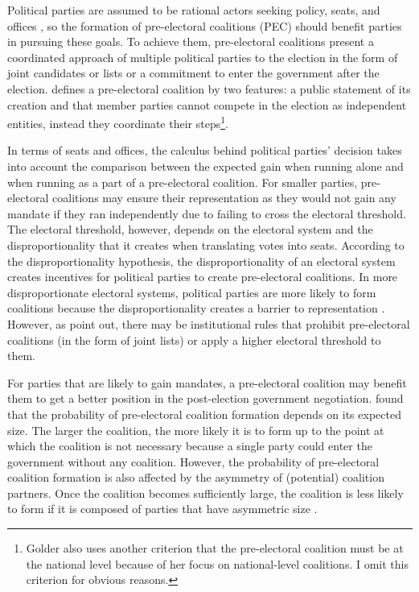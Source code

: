 \documentclass[fignum,12pt,titlepage]{article}
\begin{document}
Political parties are assumed to be rational actors seeking policy, seats, and offices \parencite{muller1999}, so the formation of pre-electoral coalitions (PEC) should benefit parties in pursuing these goals. To achieve them, pre-electoral coalitions present a coordinated approach of multiple political parties to the election in the form of joint candidates or lists or a commitment to enter the government after the election. \textcite[12]{golder2006} defines a pre-electoral coalition by two features: a public statement of its creation and that member parties cannot compete in the election as independent entities, instead they coordinate their steps\footnote{Golder also uses another criterion that the pre-electoral coalition must be at the national level because of her focus on national-level coalitions. I omit this criterion for obvious reasons.}.

In terms of seats and offices, the calculus behind political parties' decision takes into account the comparison between the expected gain when running alone and when running as a part of a pre-electoral coalition. For smaller parties, pre-electoral coalitions may ensure their representation as they would not gain any mandate if they ran independently due to failing to cross the electoral threshold. The electoral threshold, however, depends on the electoral system and the disproportionality that it creates when translating votes into seats. According to the disproportionality hypothesis, the disproportionality of an electoral system creates incentives for political parties to create pre-electoral coalitions. In more disproportionate electoral systems, political parties are more likely to form coalitions because the disproportionality creates a barrier to representation \parencite{golder2005}. However, as \textcite{ibenskas2018} point out, there may be institutional rules that prohibit pre-electoral coalitions (in the form of joint lists) or apply a higher electoral threshold to them.

For parties that are likely to gain mandates, a pre-electoral coalition may benefit them to get a better position in the post-election government negotiation. \textcite{golder2006b} found that the probability of pre-electoral coalition formation depends on its expected size. The larger the coalition, the more likely it is to form up to the point at which the coalition is not necessary because a single party could enter the government without any coalition. However, the probability of pre-electoral coalition formation is also affected by the asymmetry of (potential) coalition partners. Once the coalition becomes sufficiently large, the coalition is less likely to form if it is composed of parties that have asymmetric size \parencite[199]{golder2006b}. 
\end{document}
